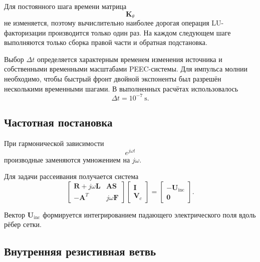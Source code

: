 \documentclass[12pt,a4paper]{article}
\newcommand{\vect}[1]{\boldsymbol{#1}}
\newcommand{\matr}[1]{\mathbf{#1}}
\begin{document}
Для постоянного шага времени матрица
\begin{equation}
    \matr K_\theta
\end{equation}
не изменяется, поэтому вычислительно наиболее дорогая операция
LU-факторизации производится только один раз. На каждом следующем шаге
выполняются только сборка правой части и обратная подстановка.

Выбор $\Delta t$ определяется характерным временем изменения источника
и собственными временными масштабами PEEC-системы. Для импульса молнии
необходимо, чтобы быстрый фронт двойной экспоненты был разрешён несколькими
временными шагами. В выполненных расчётах использовалось
\begin{equation}
    \Delta t=10^{-7}\ \si{\second}.
\end{equation}


\subsection{Частотная постановка}

При гармонической зависимости
\begin{equation}
    e^{j\omega t}
\end{equation}
производные заменяются умножением на $j\omega$.

Для задачи рассеивания получается система
\begin{equation}
\begin{bmatrix}
\matr R + j\omega\matr L
&
\matr A\matr S
\\
-\matr A^T
&
j\omega\matr F
\end{bmatrix}
\begin{bmatrix}
\vect I
\\
\vect V_c
\end{bmatrix}
=
\begin{bmatrix}
-\vect U_{\mathrm{inc}}
\\
\vect 0
\end{bmatrix}.
\label{eq:harmonic_system}
\end{equation}

Вектор $\vect U_{\mathrm{inc}}$ формируется интегрированием
падающего электрического поля вдоль рёбер сетки.


\subsection{Внутренняя резистивная ветвь}
\end{document}
